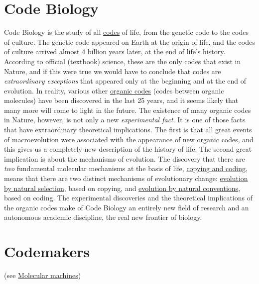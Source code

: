 \documentclass[12pt]{article}
\begin{document}
\section{Code Biology}
Code Biology is the study of all \hyperlink{code}{codes} of life, from the genetic code to the codes of culture. The genetic code appeared on Earth at the origin of life, and the codes of culture arrived almost 4 billion years later, at the end of life's history. According to official (textbook) science, these are the only codes that exist in Nature, and if this were true we would have to conclude that codes are \textit{extraordinary exceptions} that appeared only at the beginning and at the end of evolution. In reality, various other \hyperlink{organic_codes}{organic codes} (codes between organic molecules) have been discovered in the last 25 years, and it seems likely that many more will come to light in the future. The existence of many organic codes in Nature, however, is not only a new \textit{experimental fact}. It is one of those facts that have extraordinary theoretical implications. The first is that all great events of \hyperlink{macroevolution}{macroevolution} were associated with the appearance of new organic codes, and this gives us a completely new description of the history of life. The second great implication is about the mechanisms of evolution. The discovery that there are \textit{two} fundamental molecular mechanisms at the basis of life, \hyperlink{copying_and_coding}{copying and coding}, means that there are two distinct mechanisms of evolutionary change: \hyperlink{natural_selection}{evolution by natural selection}, based on copying, and \hyperlink{natural_conventions}{evolution by natural conventions}, based on coding. The experimental discoveries and the theoretical implications of the organic codes make of Code Biology an entirely new field of research and an autonomous academic discipline, the real new frontier of biology. 


\hypertarget{codemakers}{}
\section{Codemakers} (see \hyperlink{molecular_machines}{Molecular machines}) 


\hypertarget{codepoiesis}{}
\end{document}
